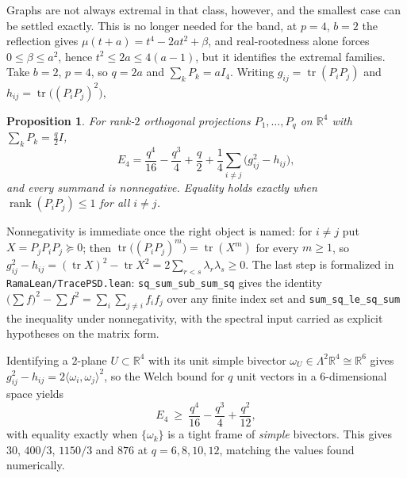 \documentclass[11pt]{article}
\newtheorem{proposition}[theorem]{Proposition}
\theoremstyle{remark}
\begin{document}
Graphs are not always extremal in that class, however, and the smallest case can be
settled exactly. This is no longer needed for the band, at $p=4$, $b=2$ the
reflection gives $\mu(t+a)=t^4-2at^2+\beta$, and real-rootedness alone forces
$0\le\beta\le a^2$, hence $t^2\le2a\le4(a-1)$, but it identifies the extremal
families. Take $b=2$, $p=4$, so $q=2a$ and $\sum_kP_k=aI_4$. Writing
$g_{ij}=\operatorname{tr}(P_iP_j)$ and $h_{ij}=\operatorname{tr}\bigl((P_iP_j)^2\bigr)$,

\begin{proposition}\label{prop:E4}
For rank-$2$ orthogonal projections $P_1,\dots,P_q$ on $\mathbb R^4$ with
$\sum_kP_k=\tfrac q2I$,
\[
E_4=\frac{q^4}{16}-\frac{q^3}{4}+\frac q2+\frac14\sum_{i\ne j}\bigl(g_{ij}^2-h_{ij}\bigr),
\]
and every summand is nonnegative. Equality holds exactly when
$\operatorname{rank}(P_iP_j)\le1$ for all $i\ne j$.
\end{proposition}

Nonnegativity is immediate once the right object is named: for $i\ne j$ put
$X=P_jP_iP_j\succeq0$; then $\operatorname{tr}\bigl((P_iP_j)^m\bigr)=\operatorname{tr}(X^m)$
for every $m\ge1$, so $g_{ij}^2-h_{ij}=(\operatorname{tr}X)^2-\operatorname{tr}X^2
=2\sum_{r<s}\lambda_r\lambda_s\ge0$. The last step is formalized in
\texttt{RamaLean/TracePSD.lean}: \texttt{sq\_sum\_sub\_sum\_sq} gives the identity
$\bigl(\sum f\bigr)^2-\sum f^2=\sum_i\sum_{j\ne i}f_if_j$ over any finite index set
and \texttt{sum\_sq\_le\_sq\_sum} the inequality under nonnegativity, with the
spectral input carried as explicit hypotheses on the matrix form.

Identifying a $2$-plane $U\subset\mathbb R^4$ with its unit simple bivector
$\omega_U\in\Lambda^2\mathbb R^4\cong\mathbb R^6$ gives
$g_{ij}^2-h_{ij}=2\langle\omega_i,\omega_j\rangle^2$, so the Welch bound for $q$
unit vectors in a $6$-dimensional space yields
\[
E_4\ \ge\ \frac{q^4}{16}-\frac{q^3}{4}+\frac{q^2}{12},
\]
with equality exactly when $\{\omega_k\}$ is a tight frame of \emph{simple}
bivectors. This gives $30$, $400/3$, $1150/3$ and $876$ at $q=6,8,10,12$, matching
the values found numerically.
\end{document}
